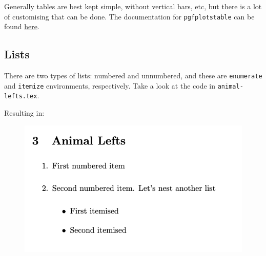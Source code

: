 Generally tables are best kept simple, without vertical bars, etc, but there is a lot of customising that can be done.
The documentation for \texttt{pgfplotstable} can be found \href{https://anorien.csc.warwick.ac.uk/mirrors/CTAN/graphics/pgf/contrib/pgfplots/doc/pgfplotstable.pdf}{here}.

\subsection{Lists}
There are two types of lists: numbered and unnumbered, and these are \verb|enumerate| and \verb|itemize| environments, respectively.
Take a look at the code in \verb|animal-lefts.tex|.



Resulting in:
\begin{figure}[h]
    \centering
        \includegraphics[scale=0.8]{figures/list.png}
    \label{fig:list}
\end{figure}

